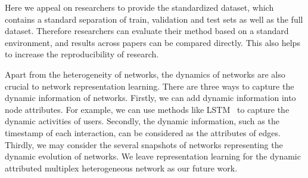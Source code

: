 \documentclass[sigconf]{acmart}
\begin{document}
Here we appeal on researchers to provide the standardized dataset, which contains a standard separation of train, validation and test sets as well as the full dataset. Therefore researchers can evaluate their method based on a standard environment, and results across papers can be compared directly. This also helps to increase the reproducibility of research. 

Apart from the heterogeneity of networks, the dynamics of networks are also crucial to network representation learning. There are three ways to capture the dynamic information of networks. Firstly, we can add dynamic information into node attributes. For example, we can use methods like LSTM~\cite{hochreiter1997long} to capture the dynamic activities of users. Secondly, the dynamic information, such as the timestamp of each interaction, can be considered as the attributes of edges. Thirdly, we may consider the several snapshots of networks representing the dynamic evolution of networks. We leave representation learning for the dynamic attributed multiplex heterogeneous network as our future work. 






 
\end{document}
